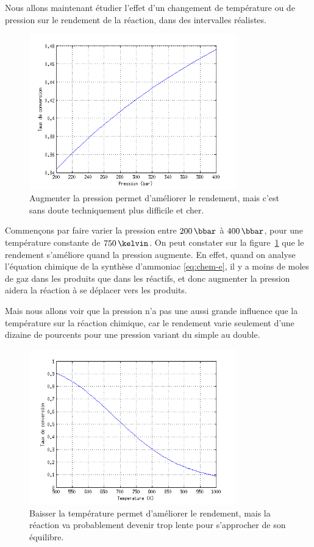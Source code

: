 Nous allons maintenant étudier l'effet d'un changement
de température ou de pression sur le rendement de la réaction,
dans des intervalles réalistes.

\begin{figure}
    \centering
    \includegraphics[width=0.8\textwidth]{img/param-press}
    \caption{
        Augmenter la pression permet d'améliorer le rendement,
        mais c'est sans doute techniquement plus difficile et cher.
    }
    \label{fig:param-press}
\end{figure}

Commençons par faire varier la pression entre $200\,\bbar$ à $400\,\bbar$, pour une température constante de $750\,\kelvin$.
On peut constater sur la figure~\ref{fig:param-press} que le rendement s'améliore quand la pression augmente. En effet, quand on analyse l'équation chimique de la synthèse d'ammoniac \eqref{eq:chem-e}, il y a moins de moles de gaz dans les produits que dans les réactifs, et donc augmenter la pression aidera la réaction à se déplacer vers les produits.

Mais nous allons voir que la pression n'a pas une aussi grande influence que la température sur la réaction chimique, car le rendement varie seulement d'une dizaine de pourcents pour une pression variant du simple au double.

\begin{figure}
    \centering
    \includegraphics[width=0.8\textwidth]{img/param-temp}
    \caption{
        Baisser la température permet d'améliorer le rendement,
        mais la réaction va probablement devenir trop lente pour s'approcher
        de son équilibre.
    }
    \label{fig:param-temp}
\end{figure}

